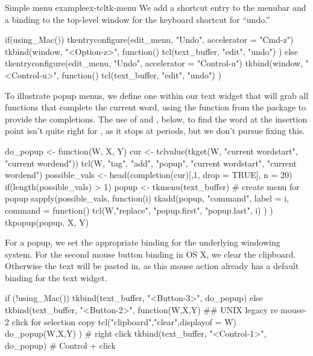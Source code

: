 \begin{example}{Simple menu example}{ex-tcltk-menu}
We add a shortcut entry to the menubar and a binding to the
top-level window for the keyboard shortcut for ``undo.''
\begin{Schunk}
\begin{Sinput}
 if(using_Mac()) {
   tkentryconfigure(edit_menu, "Undo", accelerator = "Cmd-z")
   tkbind(window, "<Option-z>", function() {
     tcl(text_buffer, "edit", "undo")
   })
 } else {
   tkentryconfigure(edit_menu, "Undo", accelerator = "Control-u")
   tkbind(window, "<Control-u>", function() {
     tcl(text_buffer, "edit", "undo")
   })
 }
\end{Sinput}
\end{Schunk}
%

To illustrate popup menus, we define one within our text widget that
will grab all functions that complete the current word, using the
 function from the  package to
provide the completions.  The use of  and
, below, to find the word at the insertion point
isn't quite right for \R, as it stops at periods, but we don't pursue
fixing this.
\begin{Schunk}
\begin{Sinput}
 do_popup <- function(W, X, Y) {
   cur <- tclvalue(tkget(W, "current  wordstart", 
                            "current wordend"))
   tcl(W, "tag", "add", "popup", "current  wordstart", 
                                 "current wordend")
   possible_vals <- head(completion(cur)[,1, drop = TRUE], n = 20)
   if(length(possible_vals) > 1) {
     popup <- tkmenu(text_buffer)         # create menu for popup
     sapply(possible_vals, function(i) {         
       tkadd(popup, "command", label = i, command = function() {
         tcl(W,"replace", "popup.first", "popup.last", i)
       })
     })
     tkpopup(popup, X, Y)
  }}
\end{Sinput}
\end{Schunk}

For a popup, we set the appropriate binding for the underlying
windowing system. For the second mouse button binding in OS X, we
clear the clipboard. Otherwise the text  will be pasted in, as this mouse
action already has a default binding for the text widget.

\begin{Schunk}
\begin{Sinput}
 if (!using_Mac()) {
   tkbind(text_buffer, "<Button-3>", do_popup)
 } else {
   tkbind(text_buffer, "<Button-2>", function(W,X,Y) {
     ## UNIX legacy re mouse-2 click for selection copy
     tcl("clipboard","clear",displayof = W) 
     do_popup(W,X,Y)
     })      # right click
   tkbind(text_buffer, "<Control-1>", do_popup)     # Control + click
 }
\end{Sinput}
\end{Schunk}
\end{example}



